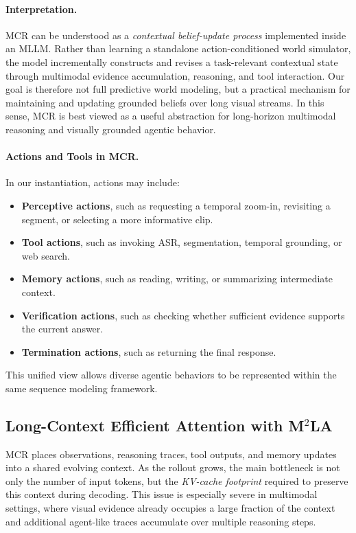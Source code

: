 \documentclass[11pt, letterpaper]{template}
\theoremstyle{plain}
\theoremstyle{definition}
\theoremstyle{remark}
\begin{document}
\paragraph{Interpretation.}
MCR can be understood as a \emph{contextual belief-update process} implemented inside an MLLM. Rather than learning a standalone action-conditioned world simulator, the model incrementally constructs and revises a task-relevant contextual state through multimodal evidence accumulation, reasoning, and tool interaction. Our goal is therefore not full predictive world modeling, but a practical mechanism for maintaining and updating grounded beliefs over long visual streams. In this sense, MCR is best viewed as a useful abstraction for long-horizon multimodal reasoning and visually grounded agentic behavior.

\paragraph{Actions and Tools in MCR.}
In our instantiation, actions may include:
\begin{itemize}[leftmargin=*]
    \item \textbf{Perceptive actions}, such as requesting a temporal zoom-in, revisiting a segment, or selecting a more informative clip.
    \item \textbf{Tool actions}, such as invoking ASR, segmentation, temporal grounding, or web search.
    \item \textbf{Memory actions}, such as reading, writing, or summarizing intermediate context.
    \item \textbf{Verification actions}, such as checking whether sufficient evidence supports the current answer.
    \item \textbf{Termination actions}, such as returning the final response.
\end{itemize}
This unified view allows diverse agentic behaviors to be represented within the same sequence modeling framework.

\subsection{Long-Context Efficient Attention with M$^2$LA}

MCR places observations, reasoning traces, tool outputs, and memory updates into a shared evolving context. As the rollout grows, the main bottleneck is not only the number of input tokens, but the \emph{KV-cache footprint} required to preserve this context during decoding. This issue is especially severe in multimodal settings, where visual evidence already occupies a large fraction of the context and additional agent-like traces accumulate over multiple reasoning steps.
\end{document}
